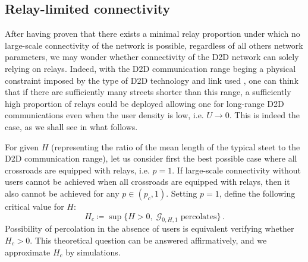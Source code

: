 \documentclass[conference]{IEEEtran}
\begin{document}
\subsection{Relay-limited connectivity}
\label{ss.RelayLimited}
After having proven that there exists a minimal relay proportion under which no large-scale connectivity of the network is possible, regardless of all others network parameters, we may wonder whether connectivity of the D2D network can solely relying on relays. Indeed, with  the D2D communication range beging a physical constraint imposed by the type of D2D technology and link used \cite{asadi_survey_2014}, one can think  that if there are sufficiently many streets shorter than this range, a sufficiently high proportion of relays could  be  deployed allowing one  for long-range D2D communications even when the user density is low, i.e. $U \rightarrow 0$. 
This is indeed the case, as we shall see in what follows.

\indent For given $H$ (representing the ratio of the mean length of the typical steet to the D2D communication range), let us consider first  the best possible case where all crossroads are equipped with relays, i.e. $p=1$. If large-scale connectivity without users cannot be achieved when all crossroads are equipped with relays, then it also cannot be achieved for any $p \in (p_c,1)$. Setting $p=1$, define the following critical value for $H$: 
\begin{equation}
    \label{critical-H}
    H_{c}  \coloneqq \sup \lbrace H > 0, \; \mathcal{G}_{0,H,1} \; \text{percolates}\}\,.
\end{equation}
Possibility of percolation in the absence of users is equivalent 
verifying whether $H_c>0$. This theoretical question can be
answered affirmatively, and we approximate $H_c$ by simulations.
\end{document}
